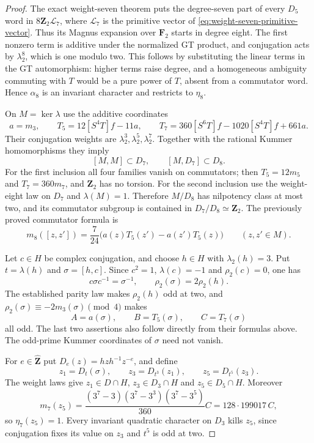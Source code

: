 \begin{proof}
The exact weight-seven theorem puts the degree-seven part of every
$D_5$ word in $8\mathbf Z_2\mathcal L_7$, where $\mathcal L_7$
is the primitive vector of \eqref{eq:weight-seven-primitive-vector}.
Thus its Magnus expansion over $\mathbf F_2$ starts in degree eight.
The first nonzero term is additive under the normalized GT product,
and conjugation acts by $\lambda_2^8$, which is one modulo two.
This follows by substituting the linear terms in the GT automorphism:
higher terms raise degree, and a homogeneous ambiguity commuting with
$T$ would be a pure power of $T$, absent from a commutator word.
Hence $\alpha_8$ is an invariant character and restricts to $\eta_8$.

On $M=\ker\lambda$ use the additive coordinates
\[
 a=m_3,\qquad T_5=12[S^4T]f-11a,\qquad
 T_7=360[S^6T]f-1020[S^4T]f+661a.
\]
Their conjugation weights are $\lambda_2^3,\lambda_2^5,\lambda_2^7$.
Together with the rational Kummer homomorphisms they imply
\[
 [M,M]\subset D_7,\qquad [M,D_7]\subset D_8.
\]
For the first inclusion all four families vanish on commutators;
then $T_5=12m_5$ and $T_7=360m_7$, and $\mathbf Z_2$ has no torsion.
For the second inclusion use the weight-eight law on $D_7$ and
$\lambda(M)=1$. Therefore $M/D_8$ has nilpotency class at most two,
and its commutator subgroup is contained in $D_7/D_8\simeq\mathbf Z_2$.
The previously proved commutator formula is
\begin{equation}\label{eq:eta-eight-commutator-pairing}
 m_8([z,z'])=\frac7{24}\bigl(a(z)T_5(z')-a(z')T_5(z)\bigr)
 \qquad(z,z'\in M).
\end{equation}

Let $c\in H$ be complex conjugation, and choose $h\in H$ with
$\lambda_2(h)=3$. Put $t=\lambda(h)$ and $\sigma=[h,c]$.
Since $c^2=1$, $\lambda(c)=-1$ and $\rho_2(c)=0$, one has
\[
 c\sigma c^{-1}=\sigma^{-1},\qquad
 \rho_2(\sigma)=2\rho_2(h).
\]
The established parity law makes $\rho_2(h)$ odd at two, and
$\rho_2(\sigma)\equiv-2m_3(\sigma)\pmod4$ makes
\[
 A=a(\sigma),\qquad B=T_5(\sigma),\qquad C=T_7(\sigma)
\]
all odd. The last two assertions also follow directly from their
formulas above. The odd-prime Kummer coordinates of $\sigma$ need
not vanish.

For $e\in\widehat{\mathbf Z}$ put
$D_e(z)=hzh^{-1}z^{-e}$, and define
\[
 z_1=D_t(\sigma),\qquad z_3=D_{t^3}(z_1),\qquad
 z_5=D_{t^5}(z_3).
\]
The weight laws give $z_1\in D\cap H$, $z_3\in D_3\cap H$ and
$z_5\in D_5\cap H$. Moreover
\[
 m_7(z_5)=\frac{(3^7-3)(3^7-3^3)(3^7-3^5)}{360}C
        =128\cdot199017\,C,
\]
so $\eta_7(z_5)=1$. Every invariant quadratic character on $D_3$
kills $z_5$, since conjugation fixes its value on $z_3$ and
$t^5$ is odd at two.


\end{proof}
